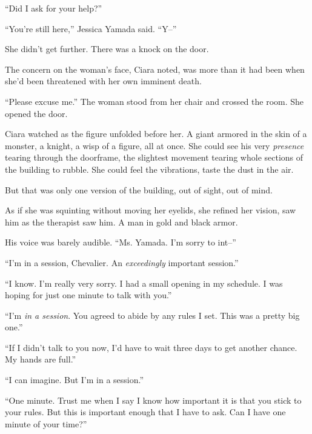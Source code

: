 ``Did I ask for your help?''



``You're still here,'' Jessica Yamada said.  ``Y--''



She didn't get further.  There was a knock on the door.



The concern on the woman's face, Ciara noted, was more than it had been when she'd been threatened with her own imminent death.



``Please excuse me.''  The woman stood from her chair and crossed the room.  She opened the door.



Ciara watched as the figure unfolded before her.  A giant armored in the skin of a monster, a knight, a wisp of a figure, all at once.  She could see his very \emph{presence} tearing through the doorframe, the slightest movement tearing whole sections of the building to rubble.  She could feel the vibrations, taste the dust in the air.



But that was only one version of the building, out of sight, out of mind.



As if she was squinting without moving her eyelids, she refined her vision, saw him as the therapist saw him.  A man in gold and black armor.



His voice was barely audible.  ``Ms. Yamada.  I'm sorry to int--''



``I'm in a session, Chevalier.  An \emph{exceedingly} important session.''



``I know.  I'm really very sorry.  I had a small opening in my schedule.  I was hoping for just one minute to talk with you.''



``I'm \emph{in a session}.  You agreed to abide by any rules I set.  This was a pretty big one.''



``If I didn't talk to you now, I'd have to wait three days to get another chance.  My hands are full.''



``I can imagine.  But I'm in a session.''



``One minute.  Trust me when I say I know how important it is that you stick to your rules.  But this is important enough that I have to ask.  Can I have one minute of your time?''



